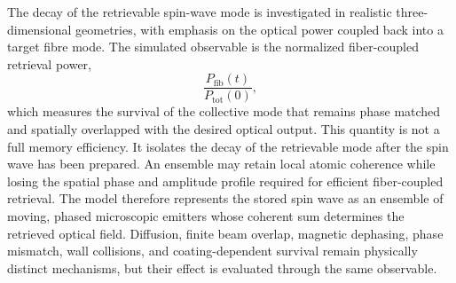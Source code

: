 The decay of the retrievable spin-wave mode is investigated in realistic three-dimensional geometries, with emphasis on the optical power coupled back into a target fibre mode. The simulated observable is the normalized fiber-coupled retrieval power,
%
\begin{equation}
    \frac{P_{\mathrm{fib}}(t)}
    {P_{\mathrm{tot}}(0)},
    \label{eq:intro_normalized_fibre_retrieval}
\end{equation}
%
which measures the survival of the collective mode that remains phase matched and spatially overlapped with the desired optical output. This quantity is not a full memory efficiency. It isolates the decay of the retrievable mode after the spin wave has been prepared. An ensemble may retain local atomic coherence while losing the spatial phase and amplitude profile required for efficient fiber-coupled retrieval. The model therefore represents the stored spin wave as an ensemble of moving, phased microscopic emitters whose coherent sum determines the retrieved optical field. Diffusion, finite beam overlap, magnetic dephasing, phase mismatch, wall collisions, and coating-dependent survival remain physically distinct mechanisms, but their effect is evaluated through the same observable. %
